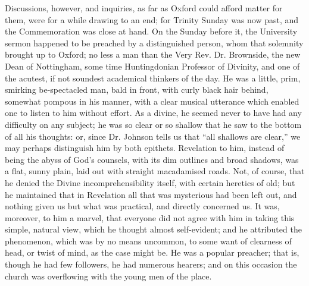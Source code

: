 Discussions, however, and inquiries, as far as Oxford could afford
matter for them, were for a while drawing to an end; for Trinity
Sunday was now past, and the Commemoration was close at hand. On the
Sunday before it, the University sermon happened to be preached by a
distinguished person, whom that solemnity brought up to Oxford; no
less a man than the Very Rev. Dr. Brownside, the new Dean of
Nottingham, some time Huntingdonian Professor of Divinity, and one of
the acutest, if not soundest academical thinkers of the day. He was a
little, prim, smirking be-spectacled man, bald in front, with curly
black hair behind, somewhat pompous in his manner, with a clear
musical utterance which enabled one to listen to him without
effort. As a divine, he seemed never to have had any difficulty on any
subject; he was so clear or so shallow that he saw to the bottom of
all his thoughts: or, since Dr. Johnson tells us that ``all
shallows are clear,'' we may perhaps distinguish him by both
epithets. Revelation to him, instead of being the abyss of God's
counsels, with its dim outlines and broad shadows, was a flat, sunny
plain, laid out with straight macadamised roads. Not, of course, that
he denied the Divine incomprehensibility itself, with certain heretics
of old; but he maintained that in Revelation all that was mysterious
had been left out, and nothing given us but what was practical, and
directly concerned us. It was, moreover, to him a marvel, that
everyone did not agree with him in taking this simple, natural view,
which he thought almost self-evident; and he attributed the
phenomenon, which was by no means uncommon, to some want of clearness
of head, or twist of mind, as the case might be. He was a popular
preacher; that is, though he had few followers, he had numerous
hearers; and on this occasion the church was overflowing with the
young men of the place.

